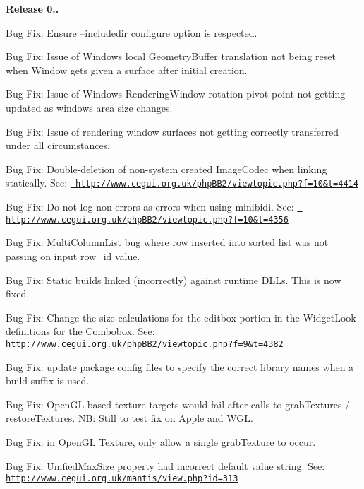 {\bfseries{Release 0..}}
\begin{DoxyItemize}
\item Bug Fix\+: Ensure --includedir configure option is respected.
\item Bug Fix\+: Issue of Window\textquotesingle{}s local Geometry\+Buffer translation not being reset when Window gets given a surface after initial creation.
\item Bug Fix\+: Issue of Window\textquotesingle{}s Rendering\+Window rotation pivot point not getting updated as window\textquotesingle{}s area size changes.
\item Bug Fix\+: Issue of rendering window surfaces not getting correctly transferred under all circumstances.
\item Bug Fix\+: Double-\/deletion of non-\/system created Image\+Codec when linking statically. See\+: \href{http://www.cegui.org.uk/phpBB2/viewtopic.php?f=10&t=4414}{\texttt{ http\+://www.\+cegui.\+org.\+uk/php\+B\+B2/viewtopic.\+php?f=10\&t=4414}}
\item Bug Fix\+: Do not log non-\/errors as errors when using minibidi. See\+: \href{http://www.cegui.org.uk/phpBB2/viewtopic.php?f=10&t=4356}{\texttt{ http\+://www.\+cegui.\+org.\+uk/php\+B\+B2/viewtopic.\+php?f=10\&t=4356}}
\item Bug Fix\+: Multi\+Column\+List bug where row inserted into sorted list was not passing on input row\+\_\+id value.
\item Bug Fix\+: Static builds linked (incorrectly) against runtime D\+L\+Ls. This is now fixed.
\item Bug Fix\+: Change the size calculations for the editbox portion in the Widget\+Look definitions for the Combobox. See\+: \href{http://www.cegui.org.uk/phpBB2/viewtopic.php?f=9&t=4382}{\texttt{ http\+://www.\+cegui.\+org.\+uk/php\+B\+B2/viewtopic.\+php?f=9\&t=4382}}
\item Bug Fix\+: update package config files to specify the correct library names when a build suffix is used.
\item Bug Fix\+: Open\+GL based texture targets would fail after calls to grab\+Textures / restore\+Textures. NB\+: Still to test fix on Apple and W\+GL.
\item Bug Fix\+: in Open\+GL Texture, only allow a single grab\+Texture to occur.
\item Bug Fix\+: Unified\+Max\+Size property had incorrect default value string. See\+: \href{http://www.cegui.org.uk/mantis/view.php?id=313}{\texttt{ http\+://www.\+cegui.\+org.\+uk/mantis/view.\+php?id=313}}

\end{DoxyItemize}
